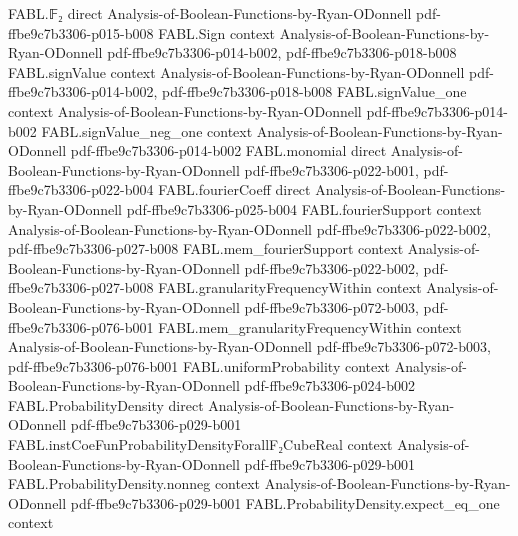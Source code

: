 \begin{theorem}
\label{FABL.ProbabilityDensity.toPMF_apply}
\leanok
{}
\proofstep
  {FABL.𝔽₂}
  {direct}
  {Analysis-of-Boolean-Functions-by-Ryan-ODonnell}
  {pdf-ffbe9c7b3306-p015-b008}
\proofstep
  {FABL.Sign}
  {context}
  {Analysis-of-Boolean-Functions-by-Ryan-ODonnell}
  {pdf-ffbe9c7b3306-p014-b002,
    pdf-ffbe9c7b3306-p018-b008}
\proofstep
  {FABL.signValue}
  {context}
  {Analysis-of-Boolean-Functions-by-Ryan-ODonnell}
  {pdf-ffbe9c7b3306-p014-b002,
    pdf-ffbe9c7b3306-p018-b008}
\proofstep
  {FABL.signValue_one}
  {context}
  {Analysis-of-Boolean-Functions-by-Ryan-ODonnell}
  {pdf-ffbe9c7b3306-p014-b002}
\proofstep
  {FABL.signValue_neg_one}
  {context}
  {Analysis-of-Boolean-Functions-by-Ryan-ODonnell}
  {pdf-ffbe9c7b3306-p014-b002}
\proofstep
  {FABL.monomial}
  {direct}
  {Analysis-of-Boolean-Functions-by-Ryan-ODonnell}
  {pdf-ffbe9c7b3306-p022-b001,
    pdf-ffbe9c7b3306-p022-b004}
\proofstep
  {FABL.fourierCoeff}
  {direct}
  {Analysis-of-Boolean-Functions-by-Ryan-ODonnell}
  {pdf-ffbe9c7b3306-p025-b004}
\proofstep
  {FABL.fourierSupport}
  {context}
  {Analysis-of-Boolean-Functions-by-Ryan-ODonnell}
  {pdf-ffbe9c7b3306-p022-b002,
    pdf-ffbe9c7b3306-p027-b008}
\proofstep
  {FABL.mem_fourierSupport}
  {context}
  {Analysis-of-Boolean-Functions-by-Ryan-ODonnell}
  {pdf-ffbe9c7b3306-p022-b002,
    pdf-ffbe9c7b3306-p027-b008}
\proofstep
  {FABL.granularityFrequencyWithin}
  {context}
  {Analysis-of-Boolean-Functions-by-Ryan-ODonnell}
  {pdf-ffbe9c7b3306-p072-b003,
    pdf-ffbe9c7b3306-p076-b001}
\proofstep
  {FABL.mem_granularityFrequencyWithin}
  {context}
  {Analysis-of-Boolean-Functions-by-Ryan-ODonnell}
  {pdf-ffbe9c7b3306-p072-b003,
    pdf-ffbe9c7b3306-p076-b001}
\proofstep
  {FABL.uniformProbability}
  {context}
  {Analysis-of-Boolean-Functions-by-Ryan-ODonnell}
  {pdf-ffbe9c7b3306-p024-b002}
\proofstep
  {FABL.ProbabilityDensity}
  {direct}
  {Analysis-of-Boolean-Functions-by-Ryan-ODonnell}
  {pdf-ffbe9c7b3306-p029-b001}
\proofstep
  {FABL.instCoeFunProbabilityDensityForallF₂CubeReal}
  {context}
  {Analysis-of-Boolean-Functions-by-Ryan-ODonnell}
  {pdf-ffbe9c7b3306-p029-b001}
\proofstep
  {FABL.ProbabilityDensity.nonneg}
  {context}
  {Analysis-of-Boolean-Functions-by-Ryan-ODonnell}
  {pdf-ffbe9c7b3306-p029-b001}
\proofstep
  {FABL.ProbabilityDensity.expect_eq_one}
  {context}

\end{theorem}
